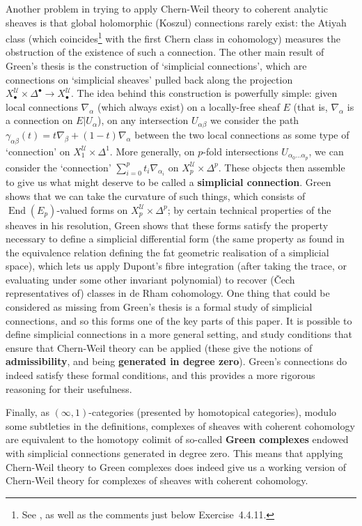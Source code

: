 \documentclass[11pt,fleqn]{article}
\theoremstyle{plain}
\theoremstyle{definition}
\theoremstyle{remark}
\numberwithin{equation}{theorem}
\newcommand{\cover}{\mathcal{U}}
\newcommand{\restricted}{\mathbin{\big\vert}}
\newcommand{\define}[1]{\textbf{#1}}
\newcommand{\nerve}[1]{X_{#1}^\cover}
\newcommand{\nervesimplex}[1]{\nerve{#1}\times\Delta^{#1}}
\DeclareMathOperator{\End}{End}
\begin{document}
    Another problem in trying to apply Chern-Weil theory to coherent analytic sheaves is that global holomorphic (Koszul) connections rarely exist: the Atiyah class (which coincides\footnote{See \cite[Exercise~4.4.8]{Huybrechts2005}, as well as the comments just below Exercise~4.4.11.} with the first Chern class in cohomology) measures the obstruction of the existence of such a connection.
    The other main result of Green's thesis is the construction of `simplicial connections', which are connections on `simplicial sheaves' pulled back along the projection $\nervesimplex{\bullet}\to\nerve{\bullet}$.
    The idea behind this construction is powerfully simple: given local connections $\nabla_\alpha$ (which always exist) on a locally-free sheaf $E$ (that is, $\nabla_\alpha$ is a connection on $E\restricted U_\alpha$), on any intersection $U_{\alpha\beta}$ we consider the path $\gamma_{\alpha\beta}(t) = t\nabla_\beta + (1-t)\nabla_\alpha$ between the two local connections as some type of `connection' on $\nerve{1}\times\Delta^1$.
    More generally, on $p$-fold intersections $U_{\alpha_0\ldots\alpha_p}$, we can consider the `connection' $\sum_{i=0}^p t_i\nabla_{\alpha_i}$ on $\nerve{p}\times\Delta^p$.
    These objects then assemble to give us what might deserve to be called a \define{simplicial connection}.
    Green shows that we can take the curvature of such things, which consists of $\End(E_p)$-valued forms on $\nerve{p}\times\Delta^p$; by certain technical properties of the sheaves in his resolution, Green shows that these forms satisfy the property necessary to define a simplicial differential form (the same property as found in the equivalence relation defining the fat geometric realisation of a simplicial space), which lets us apply Dupont's fibre integration (after taking the trace, or evaluating under some other invariant polynomial) to recover (Čech representatives of) classes in de Rham cohomology.
    One thing that could be considered as missing from Green's thesis is a formal study of simplicial connections, and so this forms one of the key parts of this paper.
    It is possible to define simplicial connections in a more general setting, and study conditions that ensure that Chern-Weil theory can be applied (these give the notions of \define{admissibility}, and being \define{generated in degree zero}).
    Green's connections do indeed satisfy these formal conditions, and this provides a more rigorous reasoning for their usefulness.

    Finally, as $(\infty,1)$-categories (presented by homotopical categories), modulo some subtleties in the definitions, complexes of sheaves with coherent cohomology are equivalent to the homotopy colimit of so-called \define{Gre{}en complexes} endowed with simplicial connections generated in degree zero.
    This means that applying Chern-Weil theory to Gre{}en complexes does indeed give us a working version of Chern-Weil theory for complexes of sheaves with coherent cohomology.
\end{document}

